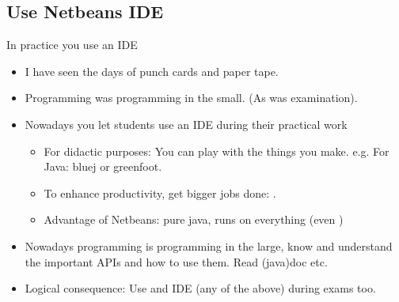 \subsection[Use an IDE]{Use Netbeans IDE}
\begin{frame}{In practice you use an IDE}
  \begin{itemize}
  \item I have seen the days of punch cards and paper tape.
  \item Programming was programming in the small. (As was examination).
  \item Nowadays you let students use an IDE during their practical work
    \begin{itemize}
    \item For didactic purposes: You can play with the things you
      make. e.g. For Java: bluej or greenfoot.
    \item To enhance productivity, get bigger jobs done: .
    \item Advantage of Netbeans: pure java, runs on everything (even
      )
    \end{itemize}
  \item Nowadays programming is programming in the large, know and
    understand the important APIs and how to use them. Read (java)doc etc.
  \item Logical consequence: Use and IDE (any of the above) during
    exams too.
  \end{itemize}
\end{frame}

